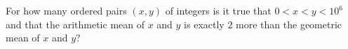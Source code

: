 For how many ordered pairs $(x,y)$ of integers is it true that $0<x<y<10^{6}$ and that the arithmetic mean of $x$ and $y$ is exactly $2$ more than the geometric mean of $x$ and $y?$